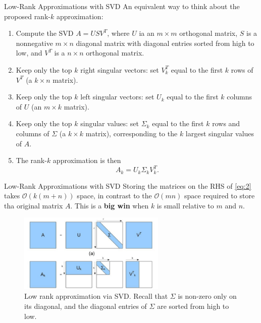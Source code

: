 \documentclass[aspectratio=169,xcolor=dvipsnames]{beamer}
\begin{document}
\begin{frame}{Low-Rank Approximations with SVD}
An equivalent way to think about the proposed rank-$k$ approximation:
\begin{enumerate}
    \item Compute the SVD $A=USV^{T}$, where $U$ ia an $m\times m$ orthogonal matrix, $S$ is a nonnegative $m\times n$ diagonal matrix with diagonal entries sorted from high to low, and $V^{T}$ is a $n\times n$ orthogonal matrix. 
    \item Keep only the top $k$ right singular vectors: set $V^{T}_k$ equal to the first $k$ rows of $V^{T}$ (a $k\times n$ matrix).
    \item Keep only the top $k$ left singular vectors: set $U_{k}$ equal to the first $k$ columns of $U$ (an $m\times k$ matrix).
    \item Keep only the top $k$ singular values: set $\Sigma_{k}$ equal to the first $k$ rows and columns of $\Sigma$ (a $k\times k$ matrix), corresponding to the $k$ largest singular values of $A$.
    \item The rank-$k$ approximation is then 
    \begin{equation}
    \label{eq:2}
        A_{k} = U_k \Sigma_k V^{T}_{k} .
    \end{equation}
\end{enumerate}
\end{frame}


\begin{frame}{Low-Rank Approximations with SVD}
    Storing the matrices on the RHS of \eqref{eq:2} takes $\mathcal{O}(k(m+n))$ space, in contrast to the $\mathcal{O}(mn)$ space required to store tha original matrix $A$. This is a \textbf{big win} when $k$ is small relative to $m$ and $n$.
    \begin{figure}[H]
    \centering
    \includegraphics[width=7cm]{images/SVDk.jpg}
    \caption{Low rank approximation via SVD. Recall that $\Sigma$ is non-zero only on its diagonal, and the diagonal entries of $\Sigma$ are sorted from high to low.}
    \label{Fig1}
\end{figure}
\end{frame}
\end{document}
